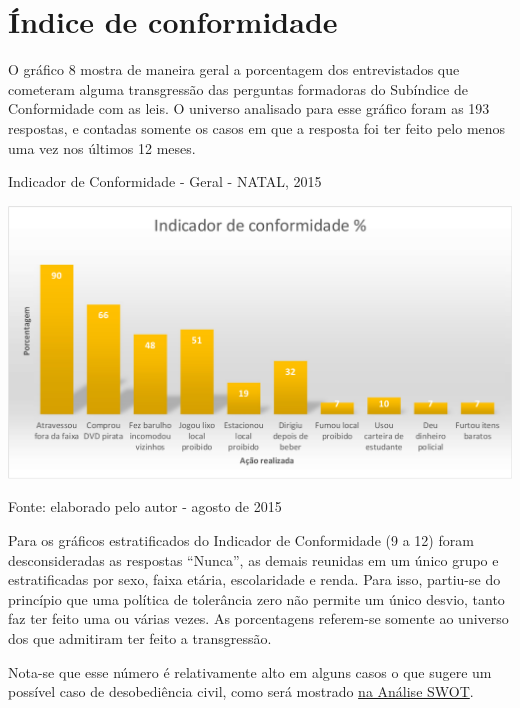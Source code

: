 \documentclass[
	12pt,				%
	openright,			%
	twoside,			%
	a4paper,			%
	chapter=TITLE,		%
	section=TITLE,		%
	subsection=TITLE,	%
	subsubsection=TITLE,%
	spanish,            %
	english,			%
	brazil				%
	]{abntex2}
\begin{document}
\section{Índice de conformidade}
O gráfico 8 mostra de maneira geral a porcentagem dos entrevistados que cometeram alguma transgressão das perguntas formadoras do Subíndice de Conformidade com as leis. O universo analisado para esse gráfico foram as 193 respostas, e contadas somente os casos em que a resposta foi ter feito pelo menos uma vez nos últimos 12 meses. 
\par
\begin{grafico}[!htpb]
	\caption{Indicador de Conformidade - Geral - NATAL, 2015}
	\begin{center}
		\includegraphics[scale=0.55]{Conformidade_geral.png}
	\end{center}
	\ABNTEXchapterfont\small{Fonte: elaborado pelo autor - agosto de 2015}
	\label{Conf_geral}
\end{grafico}
\FloatBarrier
\hypertarget{Conf1}{}
\par
Para os gráficos estratificados do Indicador de Conformidade (9 a 12) foram desconsideradas as respostas “Nunca”, as demais reunidas em um único grupo e estratificadas por sexo, faixa etária, escolaridade e renda. Para isso, partiu-se do princípio que uma política de tolerância zero não permite um único desvio, tanto faz ter feito uma ou várias vezes. As porcentagens referem-se somente ao universo dos que admitiram ter feito a transgressão. 
\par
Nota-se que esse número é relativamente alto em alguns casos o que sugere um possível caso de desobediência civil, como será mostrado \hyperlink{T1}{na Análise SWOT}.
\hypertarget{beb2}{}
\end{document}
